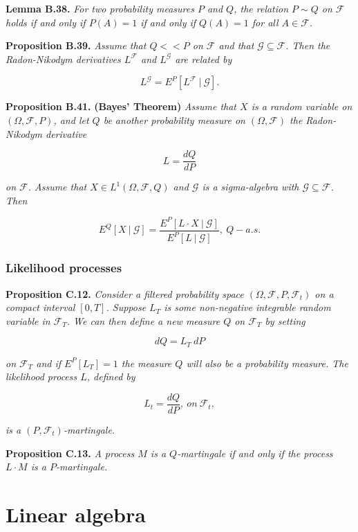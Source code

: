 \documentclass[
]{article}
\begin{document}
\textbf{Lemma B.38.} \emph{For two probability measures \(P\) and \(Q\),
the relation \(P\sim Q\) on \(\mathcal{F}\) holds if and only if
\(P(A)=1\) if and only if \(Q(A)=1\) for all \(A\in\mathcal{F}\).}

\textbf{Proposition B.39.} \emph{Assume that \(Q << P\) on
\(\mathcal{F}\) and that \(\mathcal{G}\subseteq \mathcal{F}\). Then the
Radon-Nikodym derivatives \(L^\mathcal{F}\) and \(L^\mathcal{G}\) are
related by}

\[
L^\mathcal{G}=E^P[L^\mathcal{F}\ \vert\ \mathcal{G}].\tag{B.17}
\]

\textbf{Proposition B.41.} \textbf{(Bayes' Theorem)} \emph{Assume that
\(X\) is a random variable on \((\Omega, \mathcal{F},P)\), and let \(Q\)
be another probability measure on \((\Omega,\mathcal{F})\) the
Radon-Nikodym derivative}

\[
L=\frac{d Q}{dP}
\]

\emph{on \(\mathcal{F}\). Assume that \(X\in L^1(\Omega,\mathcal{F},Q)\)
and \(\mathcal{G}\) is a sigma-algebra with
\(\mathcal{G}\subseteq \mathcal{F}\). Then}

\[
E^Q[X\ \vert\ \mathcal{G}]=\frac{E^P[L\cdot X\ \vert\ \mathcal{G}]}{E^P[L\ \vert\ \mathcal{G}]},\ Q-a.s.\tag{B.18}
\]

\hypertarget{likelihood-processes}{%
\subsubsection{Likelihood processes}\label{likelihood-processes}}

\textbf{Proposition C.12.} \emph{Consider a filtered probability space
\((\Omega, \mathcal{F},P,\mathcal{F}_t)\) on a compact interval
\([0,T]\). Suppose \(L_T\) is some non-negative integrable random
variable in \(\mathcal{F}_T\). We can then define a new measure \(Q\) on
\(\mathcal{F}_T\) by setting}

\[
dQ=L_T\ dP
\]

\emph{on \(\mathcal{F}_T\) and if \(E^P[L_T]=1\) the measure \(Q\) will
also be a probability measure. The likelihood process \(L\), defined by}

\[
L_t=\frac{dQ}{dP},\ on\ \mathcal{F}_t,\tag{C.8}
\]

\emph{is a \((P,\mathcal{F}_t)\)-martingale.}

\textbf{Proposition C.13.} \emph{A process \(M\) is a \(Q\)-martingale
if and only if the process \(L\cdot M\) is a \(P\)-martingale.}

\hypertarget{linear-algebra}{%
\section{Linear algebra}\label{linear-algebra}}
\end{document}
